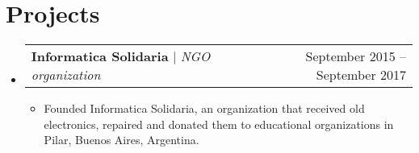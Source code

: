 \documentclass[letterpaper,11pt]{article}
\makeatletter
\newcommand{\resumeItem}[1]{
  \item\small{
    {#1 \vspace{-2pt}}
  }
}
\newcommand{\resumeProjectHeading}[2]{
    \item
    \begin{tabular*}{0.97\textwidth}{l@{\extracolsep{\fill}}r}
      \small#1 & #2 \\
    \end{tabular*}\vspace{-7pt}
}
\newcommand{\resumeSubHeadingListStart}{\begin{itemize}[leftmargin=0.15in, label={}]}
\newcommand{\resumeSubHeadingListEnd}{\end{itemize}}
\newcommand{\resumeItemListStart}{\begin{itemize}}
\newcommand{\resumeItemListEnd}{\end{itemize}\vspace{-5pt}}
\makeatother
\begin{document}
\section{Projects}
    \resumeSubHeadingListStart
      \resumeProjectHeading
          {\textbf{Informatica Solidaria} $|$ \emph{NGO organization}}{September 2015 -- September 2017}
          \resumeItemListStart
            \resumeItem{Founded Informatica Solidaria, an organization that received old electronics, repaired and donated them to educational organizations in Pilar, Buenos Aires, Argentina.}
          \resumeItemListEnd
    \resumeSubHeadingListEnd



%


\end{document}
